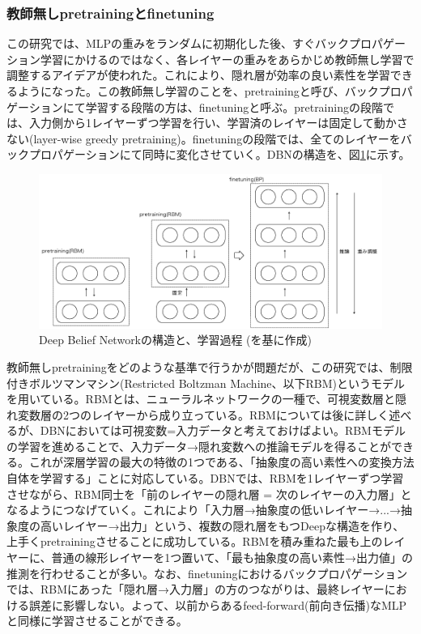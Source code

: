\subsubsection{教師無しpretrainingとfinetuning}
この研究では、MLPの重みをランダムに初期化した後、すぐバックプロパゲーション学習にかけるのではなく、各レイヤーの重みをあらかじめ教師無し学習で調整するアイデアが使われた。これにより、隠れ層が効率の良い素性を学習できるようになった。この教師無し学習のことを、pretrainingと呼び、バックプロパゲーションにて学習する段階の方は、finetuningと呼ぶ。pretrainingの段階では、入力側から1レイヤーずつ学習を行い、学習済のレイヤーは固定して動かさない(layer-wise greedy pretraining)。finetuningの段階では、全てのレイヤーをバックプロパゲーションにて同時に変化させていく。DBNの構造を、図\ref{c3_dbn}に示す。\par
\begin{figure}[tbp]
 \centering
  \includegraphics[width=120mm]{img/c3/dbn}
 \caption{Deep Belief Networkの構造と、学習過程 (\cite{hinton2006a-fast, hinton2006reducing}を基に作成)}
 \label{c3_dbn}
\end{figure}
教師無しpretrainingをどのような基準で行うかが問題だが、この研究では、制限付きボルツマンマシン(Restricted Boltzman Machine、以下RBM)というモデルを用いている。RBMとは、ニューラルネットワークの一種で、可視変数層と隠れ変数層の2つのレイヤーから成り立っている。RBMについては後に詳しく述べるが、DBNにおいては可視変数=入力データと考えておけばよい。RBMモデルの学習を進めることで、入力データ→隠れ変数への推論モデルを得ることができる。これが深層学習の最大の特徴の1つである、「抽象度の高い素性への変換方法自体を学習する」ことに対応している。DBNでは、RBMを1レイヤーずつ学習させながら、RBM同士を「前のレイヤーの隠れ層 = 次のレイヤーの入力層」となるようにつなげていく。これにより「入力層→抽象度の低いレイヤー→...→抽象度の高いレイヤー→出力」という、複数の隠れ層をもつDeepな構造を作り、上手くpretrainingさせることに成功している。RBMを積み重ねた最も上のレイヤーに、普通の線形レイヤーを1つ置いて、「最も抽象度の高い素性→出力値」の推測を行わせることが多い。なお、finetuningにおけるバックプロパゲーションでは、RBMにあった「隠れ層→入力層」の方のつながりは、最終レイヤーにおける誤差に影響しない。よって、以前からあるfeed-forward(前向き伝播)なMLPと同様に学習させることができる。
